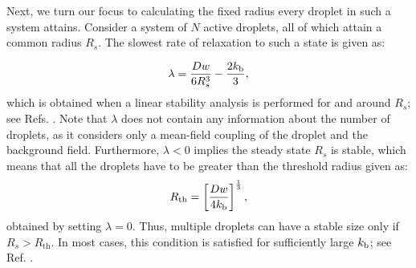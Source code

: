 Next, we turn our focus to calculating the fixed radius every droplet in such a system attains.
Consider a system of $N$ active droplets, all of which attain a common radius $R_s$.
The slowest rate of relaxation to such a state is given as:

\begin{equation}
\label{eqn:lambda}
    \lambda = \frac{D w}{6 R_s^3} - \frac{2 k_\mathrm{b}}{3},
\end{equation}
which is obtained when a linear stability analysis is performed for  and  around $R_s$; see Refs. \cite{Zwicker2015,Review2019}.
Note that $\lambda$ does not contain any information about the number of droplets, as it considers only a mean-field coupling of the droplet and the background field. 
Furthermore, $\lambda < 0$ implies the steady state $R_s$ is stable, which means that all the droplets have to be greater than the threshold radius given as:
\begin{equation*}
    R_\mathrm{th} = \left [\frac{D w}{4 k_\mathrm{b}} \right ] ^ {\frac{1}{3}},
\end{equation*}
obtained by setting $\lambda = 0$.
Thus, multiple droplets can have a stable size only if $R_s > R_\mathrm{th}$. 
In most cases, this condition is satisfied for sufficiently large $k_\mathrm{b}$; see Ref. \cite{Zwicker2015}.

